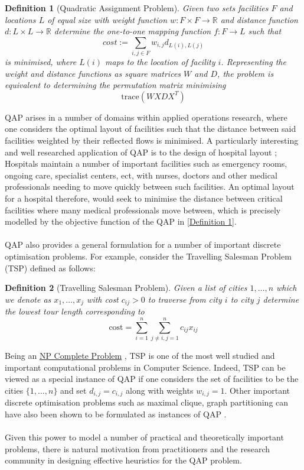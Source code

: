 \documentclass[a4paper,10pt]{article}
\newtheorem{definition}{Definition}
\begin{document}
\label{Definition 1}
\begin{definition}[Quadratic Assignment Problem] Given two sets facilities $F$ and locations $L$ of equal size with weight function $w: F\times F \rightarrow \mathbb{R}$ and distance function $d: L\times L \rightarrow \mathbb{R}$ determine the one-to-one mapping function $f: F \rightarrow L$ such that 
$$cost := \sum_{i,j\in F} w_{i,j}d_{L(i),L(j)}$$
is minimised, where $L(i)$ maps to the location of facility $i$. Representing the weight and distance functions as square matrices $W$ and $D$, the problem is equivalent to determining the permutation matrix minimising 
$$\text{trace}(WXDX^T)$$
\end{definition}
QAP arises in a number of domains within applied operations research, where one considers the optimal layout of facilities such that the distance between said facilities weighted by their reflected flows is minimised. A particularly interesting and well researched application of QAP is to the design of hospital layout \cite{Elshafei}; Hospitals maintain a number of important facilities such as emergency rooms, ongoing care, specialist centers, ect, with nurses, doctors and other medical professionals needing to move quickly between such facilities. An optimal layout for a hospital therefore, would seek to minimise the distance between critical facilities where many medical professionals move between, which is precisely modelled by the objective function of the QAP in \ref{Definition 1}. \\
\\
QAP also provides a general formulation for a number of important discrete optimisation problems. For example, consider the Travelling Salesman Problem (TSP) defined as follows:
\begin{definition}[Travelling Salesman Problem]
Given a list of cities $1,\dots,n$ which we denote as $x_1, \dots, x_j$ with cost $c_{ij}>0$ to traverse from city $i$ to city $j$ determine the lowest tour length corresponding to
$$\text{cost} = \sum_{i=1}^{n}\sum_{j\neq i, j=1}^{n}c_{ij}x_{ij}$$
\end{definition}
Being an \href{https://en.wikipedia.org/wiki/NP-completeness}{NP Complete Problem} \cite{Sahni}, TSP is one of the most well studied and important computational problems in Computer Science. Indeed, TSP can be viewed as a special instance of QAP if one considers the set of facilities to be the cities $\{1,\dots,n\}$ and set $d_{i,j} = c_{i,j}$ along with weights $w_{i,j} = 1$. Other important discrete optimisation problems such as maximal clique, graph partitioning can have also been shown to be formulated as instances of QAP \cite{Loiola07}. \\
\\
Given this power to model a number of practical and theoretically important problems, there is natural motivation from practitioners and the research community in designing effective heuristics for the QAP problem.
\end{document}
